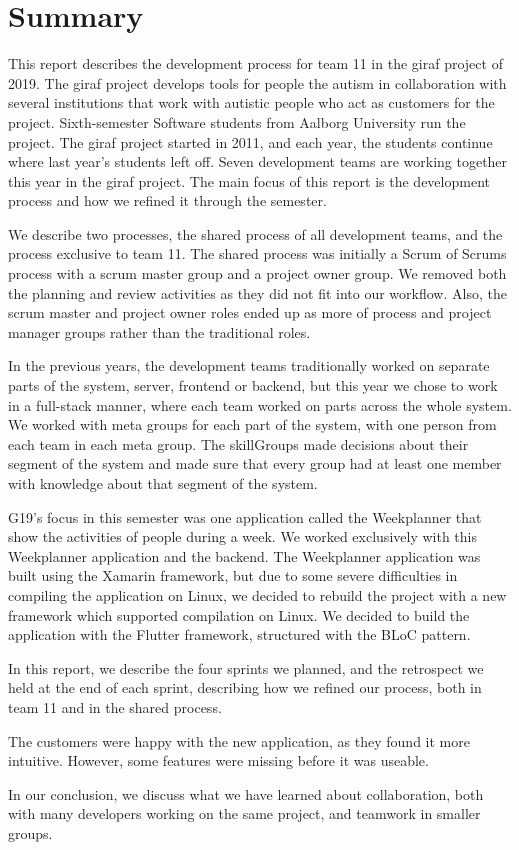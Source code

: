 \section{Summary}

This report describes the development process for team 11 in the \gls{giraf} project of 2019. The \gls{giraf} project develops tools for people the autism in collaboration with several institutions that work with autistic people who act as customers for the project. Sixth-semester Software students from Aalborg University run the project. The \gls{giraf} project started in 2011, and each year, the students continue where last year's students left off. Seven development teams are working together this year in the \gls{giraf} project. The main focus of this report is the development process and how we refined it through the semester.

We describe two processes, the shared process of all development teams, and the process exclusive to team 11. The shared process was initially a Scrum of Scrums process with a scrum master group and a project owner group. We removed both the planning and review activities as they did not fit into our workflow. Also, the scrum master and project owner roles ended up as more of process and project manager groups rather than the traditional roles. 

In the previous years, the development teams traditionally worked on separate parts of the system, server, frontend or backend, but this year we chose to work in a full-stack manner, where each team worked on parts across the whole system. We worked with meta groups for each part of the system, with one person from each team in each meta group. The \glspl{skillGroup} made decisions about their segment of the system and made sure that every group had at least one member with knowledge about that segment of the system. 

\gls{G19}'s focus in this semester was one application called the Weekplanner that show the activities of people during a week. We worked exclusively with this Weekplanner application and the backend. The Weekplanner application was built using the Xamarin framework, but due to some severe difficulties in compiling the application on Linux, we decided to rebuild the project with a new framework which supported compilation on Linux. We decided to build the application with the Flutter framework, structured with the BLoC pattern. 

In this report, we describe the four sprints we planned, and the retrospect we held at the end of each sprint, describing how we refined our process, both in team 11 and in the shared process.

The customers were happy with the new application, as they found it more intuitive. However, some features were missing before it was useable. 

In our conclusion, we discuss what we have learned about collaboration, both with many developers working on the same project, and teamwork in smaller groups. 
